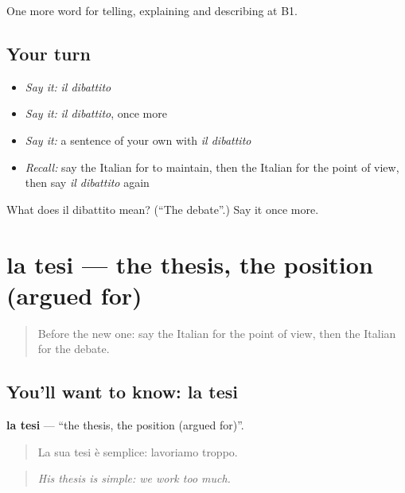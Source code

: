 \begin{grammarlens}[title={What you've built}]
One more word for telling, explaining and describing at B1.
\end{grammarlens}

\subsection*{Your turn}
\begin{itemize}
\raggedright
  \item \emph{Say it:} \emph{il dibattito}
  \item \emph{Say it:} \emph{il dibattito}, once more
  \item \emph{Say it:} a sentence of your own with \emph{il dibattito}
  \item \emph{Recall:} say the Italian for to maintain, then the Italian for the point of view, then say \emph{il dibattito} again
\end{itemize}

\begin{tcolorbox}[breakable,colback=teal!4,colframe=teal!35!black,title={Before you move on}]
What does il dibattito mean? (\textquotedblleft{}The debate\textquotedblright{}.) Say it once more.
\end{tcolorbox}
\section[la tesi]{la tesi — the thesis, the position (argued for)}

\label{lesson:IT-C340-tesi}



\begin{quote}
Before the new one: say the Italian for the point of view, then the Italian for the debate.
\end{quote}

\subsection*{You'll want to know: la tesi}
\textbf{la tesi} — \textquotedblleft{}the thesis, the position (argued for)\textquotedblright{}.

\begin{quote}
La sua tesi è semplice: lavoriamo troppo.
\end{quote}

\begin{quote}
\emph{His thesis is simple: we work too much.}
\end{quote}

